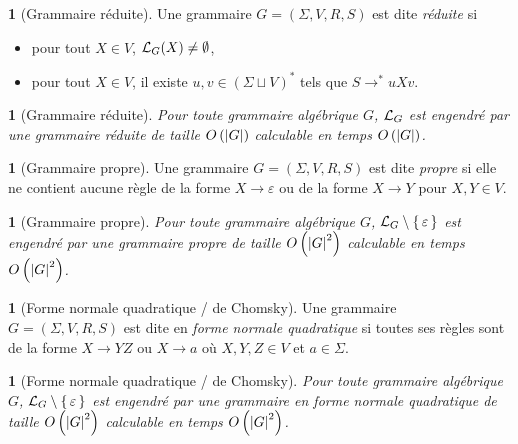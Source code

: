 \documentclass[10pt,a4paper,notitlepage]{article}
\theoremstyle{plain}
\theoremstyle{definition}
\newtheorem{defn}[thm]{\protect\definitionname}
\theoremstyle{definition}
\theoremstyle{remark}
\theoremstyle{remark}
\theoremstyle{plain}
\theoremstyle{plain}
\newtheorem{prop}[thm]{\protect\propositionname}
\theoremstyle{plain}
\theoremstyle{remark}
\providecommand{\definitionname}{Définition}
\providecommand{\propositionname}{Proposition}
\begin{document}
\begin{defn}[Grammaire réduite]
	Une grammaire $G=(\Sigma,V,R,S)$ est dite \emph{réduite} si
	\begin{itemize}
		\item pour tout $X\in V$, $\mathcal{L}_G(X)\not=\emptyset$,
		\item pour tout $X\in V$, il existe $u,v\in(\Sigma\sqcup V)^*$ tels que $S\to^*uXv$.
	\end{itemize}
\end{defn}

\begin{prop}[Grammaire réduite]
	Pour toute grammaire algébrique $G$, $\mathcal{L}_{G}$ est engendré par une grammaire réduite de taille $O\left(\left|G\right|\right)$
	calculable en temps $O\left(\left|G\right|\right)$.
\end{prop}

\begin{defn}[Grammaire propre]
	Une grammaire $G=(\Sigma,V,R,S)$ est dite \emph{propre} si elle ne contient aucune règle de la forme $X\to \varepsilon$ ou de la forme $X\to Y$ pour $X,Y\in V$.
\end{defn}

\begin{prop}[Grammaire propre]
	Pour toute grammaire algébrique $G$, $\mathcal{L}_{G}\setminus\set{\varepsilon}$ est engendré par une grammaire
	propre de taille $O\left(\left|G\right|^{2}\right)$ calculable en temps $O\left(\left|G\right|^{2}\right)$.
\end{prop}

\begin{defn}[Forme normale quadratique / de Chomsky]
	Une grammaire $G=(\Sigma,V,R,S)$ est dite en \emph{forme normale quadratique} si toutes ses règles sont de la forme $X\to YZ$ ou $X\to a$ où $X,Y,Z\in V$ et $a\in\Sigma$.
\end{defn}

\begin{prop}[Forme normale quadratique / de Chomsky]
	Pour toute grammaire algébrique $G$, $\mathcal{L}_{G}\setminus\set{\varepsilon}$ est engendré par une grammaire
	en forme normale quadratique de taille $O\left(\left|G\right|^{2}\right)$
	calculable en temps $O\left(\left|G\right|^{2}\right)$.
\end{prop}

\end{document}
